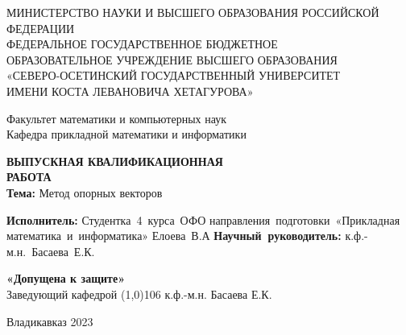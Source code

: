 \documentclass[a4paper,14pt]{article} %
\begin{document}
\onehalfspacing
\setlength{\parindent}{1.25cm} %
\begin{titlepage}
\newpage
\begin{center}
\small{МИНИСТЕРСТВО НАУКИ И ВЫСШЕГО ОБРАЗОВАНИЯ РОССИЙСКОЙ ФЕДЕРАЦИИ \\
     ФЕДЕРАЛЬНОЕ ГОСУДАРСТВЕННОЕ БЮДЖЕТНОЕ \\ОБРАЗОВАТЕЛЬНОЕ УЧРЕЖДЕНИЕ 
     ВЫСШЕГО ОБРАЗОВАНИЯ\\ «СЕВЕРО-ОСЕТИНСКИЙ ГОСУДАРСТВЕННЫЙ УНИВЕРСИТЕТ \\
     ИМЕНИ КОСТА ЛЕВАНОВИЧА ХЕТАГУРОВА» \\}
\end{center}
\vspace {2em}
\begin{center}
\small{Факультет математики и компьютерных наук \\
     Кафедра прикладной математики и информатики \\
     }
\end{center}
\vspace{2em}
\begin{center}
\textbf{ВЫПУСКНАЯ КВАЛИФИКАЦИОННАЯ} \\
\textbf{РАБОТА} \\
\vspace{2em}
\textbf{Тема:} Метод опорных векторов
 \\
\end{center}
\vspace{3em}
\begin{flushright}
\vbox{%
\hfill%
\vbox{%
\hbox{\textbf{Исполнитель:}}%
\hbox{Студентка 4 курса ОФО}%
\hbox{направления подготовки «Прикладная}%
\hbox{математика и информатика»}
\hbox{Елоева В.А}
\vspace{1em}
\hbox{\textbf{Научный руководитель:}}
\hbox{к.ф.-м.н. Басаева Е.К.}
}%
} 

\end{flushright}
\vspace{1em}
\begin{flushleft}
    \textbf{«Допущена к защите»} \\
    \vspace {1em}
Заведующий кафедрой \line(1,0){106}  к.ф.-м.н. Басаева Е.К.

\end{flushleft}
\vspace{2em}
\begin{center}
Владикавказ 2023 \\
\end{center}
\end{titlepage}
\setcounter{page}{2} %
\newpage 
\begin{center}
    \tableofcontents
\end{center}
\newpage 
\newpage
\setcounter{subsection}{0}
\setcounter{equation}{0}
\setcounter{section}{0}
\end{document}
